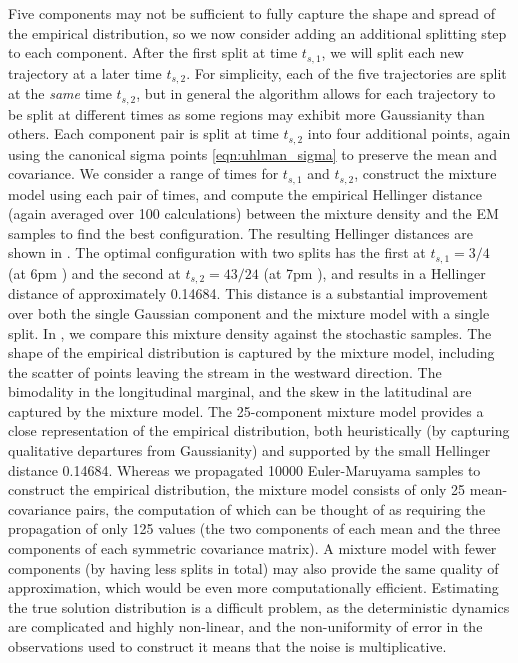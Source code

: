 Five components may not be sufficient to fully capture the shape and spread of the empirical distribution, so we now consider adding an additional splitting step to each component.
After the first split at time \(t_{s,1}\), we will split each new trajectory at a later time \(t_{s,2}\).
For simplicity, each of the five trajectories are split at the \emph{same} time \(t_{s,2}\), but in general the algorithm allows for each trajectory to be split at different times as some regions may exhibit more Gaussianity than others.
Each component pair is split at time \(t_{s,2}\) into four additional points, again using the canonical sigma points \cref{eqn:uhlman_sigma} to preserve the mean and covariance.
We consider a range of times for \(t_{s,1}\) and \(t_{s,2}\), construct the mixture model using each pair of times, and compute the empirical Hellinger distance (again averaged over 100 calculations) between the mixture density and the EM samples to find the best configuration.
The resulting Hellinger distances are shown in .
The optimal configuration with two splits has the first at \(t_{s,1} = 3/4\) (at 6pm ) and the second at \(t_{s,2} = 43/24\) (at 7pm ), and results in a Hellinger distance of approximately 0.14684.
This distance is a substantial improvement over both the single Gaussian component and the mixture model with a single split.
In , we compare this mixture density against the stochastic samples.
The shape of the empirical distribution is captured by the mixture model, including the scatter of points leaving the stream in the westward direction.
The bimodality in the longitudinal marginal, and the skew in the latitudinal are captured by the mixture model.%
The 25-component mixture model provides a close representation of the empirical distribution, both heuristically (by capturing qualitative departures from Gaussianity) and supported by the small Hellinger distance 0.14684.
Whereas we propagated 10000 Euler-Maruyama samples to construct the empirical distribution, the mixture model consists of only 25 mean-covariance pairs, the computation of which can be thought of as requiring the propagation of only 125 values (the two components of each mean and the three components of each symmetric covariance matrix).
A mixture model with fewer components (by having less splits in total) may also provide the same quality of approximation, which would be even more computationally efficient.
Estimating the true solution distribution is a difficult problem, as the deterministic dynamics are complicated and highly non-linear, and the non-uniformity of error in the observations used to construct it means that the noise is multiplicative.

